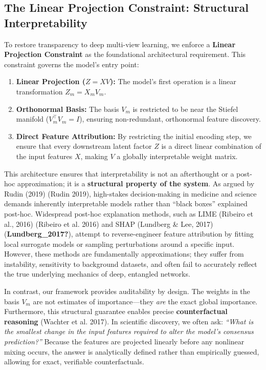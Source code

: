 \documentclass[
  letterpaper,
]{report}
\providecommand{\tightlist}{%
  \setlength{\itemsep}{0pt}\setlength{\parskip}{0pt}}
\begin{document}
\subsection{The Linear Projection Constraint: Structural
Interpretability}\label{the-linear-projection-constraint-structural-interpretability}

To restore transparency to deep multi-view learning, we enforce a
\textbf{Linear Projection Constraint} as the foundational architectural
requirement. This constraint governs the model's entry point:

\begin{enumerate}
\def\labelenumi{\arabic{enumi}.}
\tightlist
\item
  \textbf{Linear Projection (\(Z = XV\)):} The model's first operation
  is a linear transformation \(Z_m = X_m V_m\).
\item
  \textbf{Orthonormal Basis:} The basis \(V_m\) is restricted to be near
  the Stiefel manifold (\(V_m^\top V_m = I\)), ensuring non-redundant,
  orthonormal feature discovery.
\item
  \textbf{Direct Feature Attribution:} By restricting the initial
  encoding step, we ensure that every downstream latent factor \(Z\) is
  a direct linear combination of the input features \(X\), making \(V\)
  a globally interpretable weight matrix.
\end{enumerate}

This architecture ensures that interpretability is not an afterthought
or a post-hoc approximation; it is a \textbf{structural property of the
system}. As argued by Rudin (2019) (Rudin 2019), high-stakes
decision-making in medicine and science demands inherently interpretable
models rather than ``black boxes'' explained post-hoc. Widespread
post-hoc explanation methods, such as LIME (Ribeiro et al., 2016)
(Ribeiro et al. 2016) and SHAP (Lundberg \& Lee, 2017)
(\textbf{Lundberg\_2017?}), attempt to reverse-engineer feature
attribution by fitting local surrogate models or sampling perturbations
around a specific input. However, these methods are fundamentally
approximations; they suffer from instability, sensitivity to background
datasets, and often fail to accurately reflect the true underlying
mechanics of deep, entangled networks.

In contrast, our framework provides auditability by design. The weights
in the basis \(V_m\) are not estimates of importance---they \emph{are}
the exact global importance. Furthermore, this structural guarantee
enables precise \textbf{counterfactual reasoning} (Wachter et al. 2017).
In scientific discovery, we often ask: \emph{``What is the smallest
change in the input features required to alter the model's consensus
prediction?''} Because the features are projected linearly before any
nonlinear mixing occurs, the answer is analytically defined rather than
empirically guessed, allowing for exact, verifiable counterfactuals.
\end{document}
